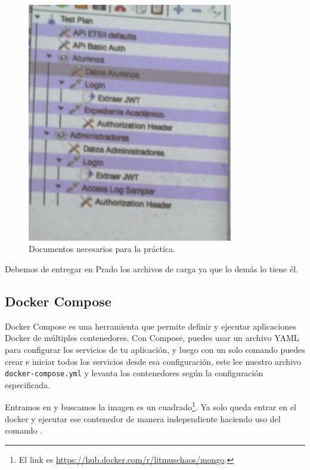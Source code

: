 \begin{figure}[H]
  \centering
  \includegraphics[width=0.8\textwidth]{images/Bloque2/docs_clase_jmeter.png}
  \caption{Documentos necesarios para la práctica.}
  \label{fig:documentos_practica}
\end{figure}

Debemos de entregar en Prado los archivos de carga ya que lo demás lo tiene él.

\subsection*{Docker Compose}

Docker Compose es una herramienta que permite definir y ejecutar aplicaciones Docker de múltiples contenedores. Con Compose, puedes usar un archivo YAML para configurar los servicios de tu aplicación, y luego con un solo comando puedes crear e iniciar todos los servicios desde esa configuración, este lee nuestro archivo \texttt{docker-compose.yml} y levanta los contenedores según la configuración especificada.

Entramos en  y buscamos  la imagen es un cuadrado\footnote{El link es \url{https://hub.docker.com/r/litmuschaos/mongo}.}. Ya solo queda entrar en el docker y ejecutar ese contenedor de manera independiente haciendo uso del comando .

